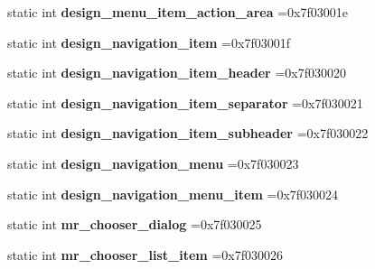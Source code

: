 \begin{DoxyCompactItemize}
static int {\bfseries design\+\_\+menu\+\_\+item\+\_\+action\+\_\+area} =0x7f03001e
\item 
\mbox{\label{classandroid_1_1support_1_1design_1_1R_1_1layout_a8a57df7db3bcc5cf9bf6771b800bf260}} 
static int {\bfseries design\+\_\+navigation\+\_\+item} =0x7f03001f
\item 
\mbox{\label{classandroid_1_1support_1_1design_1_1R_1_1layout_acc16bdc5de394ae62f2dbb89713cdf8b}} 
static int {\bfseries design\+\_\+navigation\+\_\+item\+\_\+header} =0x7f030020
\item 
\mbox{\label{classandroid_1_1support_1_1design_1_1R_1_1layout_a888bb712c1bf6aad0b1e798118c3f759}} 
static int {\bfseries design\+\_\+navigation\+\_\+item\+\_\+separator} =0x7f030021
\item 
\mbox{\label{classandroid_1_1support_1_1design_1_1R_1_1layout_abc27e76d7197f9b81018dd2bd7911e72}} 
static int {\bfseries design\+\_\+navigation\+\_\+item\+\_\+subheader} =0x7f030022
\item 
\mbox{\label{classandroid_1_1support_1_1design_1_1R_1_1layout_aaa5d5d06d17135ecb391b6a558b46380}} 
static int {\bfseries design\+\_\+navigation\+\_\+menu} =0x7f030023
\item 
\mbox{\label{classandroid_1_1support_1_1design_1_1R_1_1layout_a2f9a82563d39e2a8a50179a4b2df896a}} 
static int {\bfseries design\+\_\+navigation\+\_\+menu\+\_\+item} =0x7f030024
\item 
\mbox{\label{classandroid_1_1support_1_1design_1_1R_1_1layout_a5ff7cba41578cf6ace0dfedee734960b}} 
static int {\bfseries mr\+\_\+chooser\+\_\+dialog} =0x7f030025
\item 
\mbox{\label{classandroid_1_1support_1_1design_1_1R_1_1layout_a2ecd9726cd7475158dc0d403516fd49f}} 
static int {\bfseries mr\+\_\+chooser\+\_\+list\+\_\+item} =0x7f030026

\end{DoxyCompactItemize}

